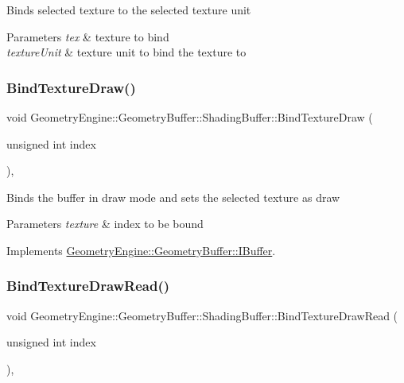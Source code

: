 Binds selected texture to the selected texture unit 
\begin{DoxyParams}{Parameters}
{\em tex} & texture to bind \\
\hline
{\em texture\+Unit} & texture unit to bind the texture to \\
\hline
\end{DoxyParams}
\mbox{\label{class_geometry_engine_1_1_geometry_buffer_1_1_shading_buffer_ab7598c22cfdc926a5fea29734160c10b}} 
\subsubsection{\texorpdfstring{BindTextureDraw()}{BindTextureDraw()}}
{\footnotesize\ttfamily void Geometry\+Engine\+::\+Geometry\+Buffer\+::\+Shading\+Buffer\+::\+Bind\+Texture\+Draw (\begin{DoxyParamCaption}\item[{unsigned int}]{index }\end{DoxyParamCaption})\hspace{0.3cm}{\ttfamily [override]}, {\ttfamily [virtual]}}

Binds the buffer in draw mode and sets the selected texture as draw 
\begin{DoxyParams}{Parameters}
{\em texture} & index to be bound \\
\hline
\end{DoxyParams}


Implements \mbox{\hyperlink{class_geometry_engine_1_1_geometry_buffer_1_1_i_buffer_ac5b3fcf3ea4dfc4e5530cb0f4a9005a6}{Geometry\+Engine\+::\+Geometry\+Buffer\+::\+I\+Buffer}}.

\mbox{\label{class_geometry_engine_1_1_geometry_buffer_1_1_shading_buffer_ad11150c070d2b598864a227d48919237}} 
\subsubsection{\texorpdfstring{BindTextureDrawRead()}{BindTextureDrawRead()}}
{\footnotesize\ttfamily void Geometry\+Engine\+::\+Geometry\+Buffer\+::\+Shading\+Buffer\+::\+Bind\+Texture\+Draw\+Read (\begin{DoxyParamCaption}\item[{unsigned int}]{index }\end{DoxyParamCaption})\hspace{0.3cm}{\ttfamily [override]}, {\ttfamily [virtual]}}

